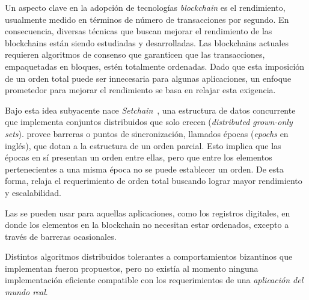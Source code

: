   Un aspecto clave en la adopción de tecnologías \textit{blockchain} es el rendimiento,
  usualmente medido en términos de número de transacciones por segundo.
  En consecuencia, diversas técnicas que buscan mejorar el rendimiento de las blockchains
  están siendo estudiadas y desarrolladas.
  Las blockchains actuales requieren algoritmos de consenso que garanticen que las
  transacciones, empaquetadas en bloques, estén totalmente ordenadas.
  Dado que esta imposición de un orden total puede ser innecesaria para algunas aplicaciones,
  un enfoque prometedor para mejorar el rendimiento se basa en relajar esta exigencia.

  Bajo esta idea subyacente nace \textit{Setchain}~\cite{Capretto.2022.Setchain}, una estructura de
  datos concurrente que implementa conjuntos distribuidos que solo crecen
  (\textit{distributed grown-only sets}).
  \setchain provee barreras o puntos de sincronización,
  llamados épocas (\textit{epochs} en inglés), que dotan a la estructura de un orden parcial.
  Esto implica que las épocas en sí presentan un orden entre ellas,
  pero que entre los elementos pertenecientes a una misma época no
  se puede establecer un orden.
  De esta forma, relaja el requerimiento de orden total buscando lograr mayor
  rendimiento y escalabilidad.
  

  Las \setchains se pueden usar para aquellas aplicaciones, como los registros digitales,
  en donde los elementos en la blockchain no necesitan estar ordenados, excepto a través
  de barreras ocasionales.
  
  
  Distintos algoritmos distribuidos tolerantes a comportamientos bizantinos que
  implementan \setchain fueron propuestos, pero no existía al momento ninguna
  implementación eficiente compatible con
  los requerimientos de una \textit{aplicación del mundo real}.
  

